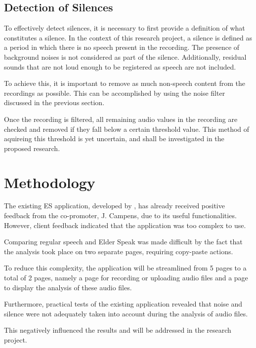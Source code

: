 \documentclass[english]{hogent-article}
\begin{document}
\subsection{Detection of Silences}
\label{subsec:detection-of-silences}

To effectively detect silences, it is necessary to first provide a definition of what constitutes a silence.
In the context of this research project, a silence is defined as a period in which there is no speech present in the recording.
The presence of background noises is not considered as part of the silence.
Additionally, residual sounds that are not loud enough to be registered as speech are not included.

\medskip

To achieve this, it is important to remove as much non-speech content from the recordings as possible.
This can be accomplished by using the noise filter discussed in the previous section.

\medskip

Once the recording is filtered, all remaining audio values in the recording are checked and removed if they fall below a certain threshold value.
This method of aquireing this threshold is yet uncertain, and shall be investigated in the proposed research.

\section{Methodology}%
\label{sec:methodology}


The existing ES application, developed by \cite{DeGussem2022}, has already received positive feedback from the co-promoter, J. Campens, due to its useful functionalities. However, client feedback indicated that the application was too complex to use.

Comparing regular speech and Elder Speak was made difficult by the fact that the analysis took place on two separate pages, requiring copy-paste actions.

To reduce this complexity, the application will be streamlined from 5 pages to a total of 2 pages, namely a page for recording or uploading audio files and a page to display the analysis of these audio files.

Furthermore, practical tests of the existing application revealed that noise and silence were not adequately taken into account during the analysis of audio files.

This negatively influenced the results and will be addressed in the research project.
\end{document}
